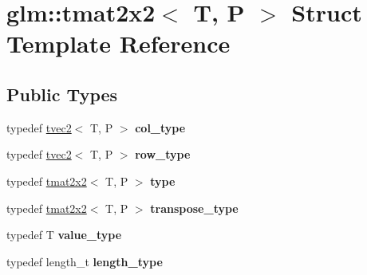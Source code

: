 \hypertarget{structglm_1_1tmat2x2}{\section{glm\-:\-:tmat2x2$<$ T, P $>$ Struct Template Reference}
\label{structglm_1_1tmat2x2}
}
\subsection*{Public Types}
\begin{DoxyCompactItemize}
\item 
\hypertarget{structglm_1_1tmat2x2_a9e4690f52926b475b36ed5f6209f22f4}{typedef \hyperlink{structglm_1_1tvec2}{tvec2}$<$ T, P $>$ {\bfseries col\-\_\-type}}\label{structglm_1_1tmat2x2_a9e4690f52926b475b36ed5f6209f22f4}

\item 
\hypertarget{structglm_1_1tmat2x2_ae47fdac58575c6c061ef9af82d342367}{typedef \hyperlink{structglm_1_1tvec2}{tvec2}$<$ T, P $>$ {\bfseries row\-\_\-type}}\label{structglm_1_1tmat2x2_ae47fdac58575c6c061ef9af82d342367}

\item 
\hypertarget{structglm_1_1tmat2x2_ab558dcd4da9d21b6c5c5681ec536d6e1}{typedef \hyperlink{structglm_1_1tmat2x2}{tmat2x2}$<$ T, P $>$ {\bfseries type}}\label{structglm_1_1tmat2x2_ab558dcd4da9d21b6c5c5681ec536d6e1}

\item 
\hypertarget{structglm_1_1tmat2x2_af3fafee9ef3082f4a2aa80cc25ce5b36}{typedef \hyperlink{structglm_1_1tmat2x2}{tmat2x2}$<$ T, P $>$ {\bfseries transpose\-\_\-type}}\label{structglm_1_1tmat2x2_af3fafee9ef3082f4a2aa80cc25ce5b36}

\item 
\hypertarget{structglm_1_1tmat2x2_aeac2c876456c92309d99f949824710b5}{typedef T {\bfseries value\-\_\-type}}\label{structglm_1_1tmat2x2_aeac2c876456c92309d99f949824710b5}

\item 
\hypertarget{structglm_1_1tmat2x2_a89bfd406715f8c3ae1c1f503d640fbb6}{typedef length\-\_\-t {\bfseries length\-\_\-type}}\label{structglm_1_1tmat2x2_a89bfd406715f8c3ae1c1f503d640fbb6}

\end{DoxyCompactItemize}

